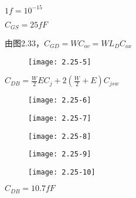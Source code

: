 $1f=10^{-15}$

$C_{GS}=25fF$

由图2.33，$C_{GD}=WC_{ov}=WL_DC_{ox}$

\begin{figure}[H] %
	\begin{minipage}{\linewidth}
		\texttt{[image: 2.25-5]}
	\end{minipage}
\end{figure}

$C_{DB}=\frac{W}{2}EC_j+2(\frac{W}{2}+E)C_{jsw}$


\begin{figure}[H] %
	\begin{minipage}{\linewidth}
		\texttt{[image: 2.25-6]}
	\end{minipage}
\end{figure}

\begin{figure}[H] %
	\begin{minipage}{\linewidth}
		\texttt{[image: 2.25-7]}
	\end{minipage}
\end{figure}

\begin{figure}[H] %
	\begin{minipage}{\linewidth}
		\texttt{[image: 2.25-8]}
	\end{minipage}
\end{figure}

\begin{figure}[H] %
	\begin{minipage}{\linewidth}
		\texttt{[image: 2.25-9]}
	\end{minipage}
\end{figure}

\begin{figure}[H] %
	\begin{minipage}{\linewidth}
		\texttt{[image: 2.25-10]}
	\end{minipage}
\end{figure}














$C_{DB}=10.7fF$